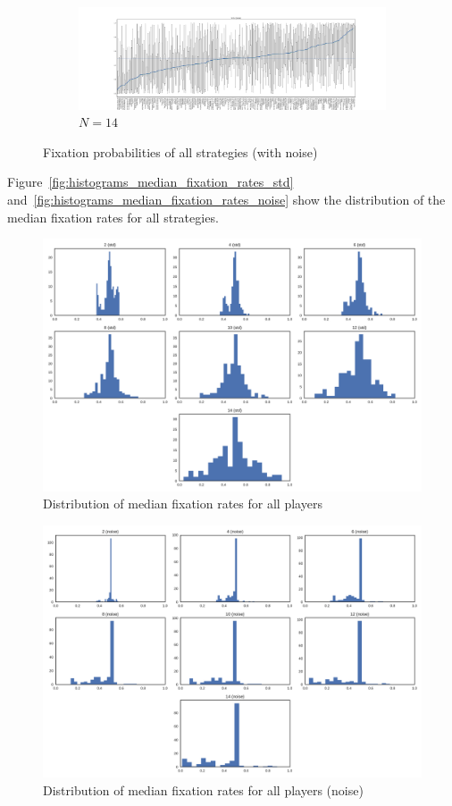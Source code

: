 \documentclass{article}
\begin{document}
\begin{figure}[!hbtp]
    \begin{subfigure}[t]{\textwidth}
        \centering
        \includegraphics[width=\textwidth]{../img/fixation_boxplot_14_noise.pdf}
        \caption{\(N=14\)}
    \end{subfigure}%
    \caption{Fixation probabilities of all strategies (with noise)}
    \label{fig:fixation_boxplot_std}
\end{figure}

Figure~\ref{fig:histograms_median_fixation_rates_std}
and~\ref{fig:histograms_median_fixation_rates_noise} show the distribution of
the median fixation rates for all strategies.

\begin{figure}[!hbtp]
    \centering
    \includegraphics[width=.8\textwidth]{../img/histograms_median_fixation_rates_std.pdf}
    \caption{Distribution of median fixation rates for all players}
\end{figure}

\begin{figure}[!hbtp]
    \centering
    \includegraphics[width=.8\textwidth]{../img/histograms_median_fixation_rates_noise.pdf}
    \caption{Distribution of median fixation rates for all players (noise)}
\end{figure}
\end{document}
